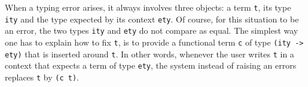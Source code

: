 % 
% 
% 


\mcbREQUIRE{}
\mcbPROVIDE{}


When a typing error arises, it always involves three objects:
a term \lstinline/t/, its type \lstinline/ity/ and the type
expected by its context \lstinline/ety/.  Of course, for this
situation to be an error, the two types \lstinline/ity/ and
\lstinline/ety/ do not compare as equal.
The simplest way one has to explain \Coq{} how to fix \lstinline/t/,
is to provide a functional term \lstinline/c/ of type
\lstinline/(ity -> ety)/ that is inserted around \lstinline/t/.
In other words, whenever the user writes \lstinline/t/ in a context
that expects a term of type \lstinline/ety/, the system instead of
raising an errors replaces \lstinline/t/ by \lstinline/(c t)/.

